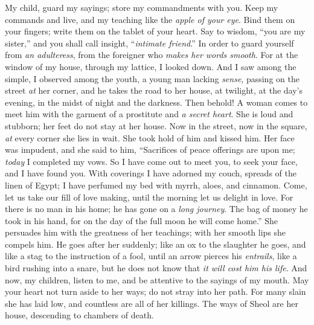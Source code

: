 \begin{biblechapter} %
 My child, guard my sayings; 
store my commandments with you.
\verse Keep my commands and live, 
and my teaching like the \textit{apple of your eye}.
\verse Bind them on your fingers; 
write them on the tablet of your heart.
\verse Say to wisdom, “you are my sister,” 
and you shall call insight, “\textit{intimate friend}.”
\verse In order to guard yourself from \textit{an adulteress}, 
from the foreigner who \textit{makes her words smooth}.
\verse For at the window of my house, 
through my lattice, I looked down.
\verse And I saw among the simple, 
I observed among the youth, 
a young man lacking \textit{sense},
\verse passing on the street \textit{at} her corner, 
and he takes the road to her house,
\verse at twilight, at the day’s evening, 
in the midst of night and the darkness.
\verse Then behold! A woman comes to meet him 
with the garment of a prostitute and \textit{a secret heart}.
\verse She is loud and stubborn; 
her feet do not stay at her house.
\verse Now in the street, now in the square, 
\textit{at} every corner she lies in wait.
\verse She took hold of  him and kissed him. 
Her face was impudent, and she said to him,
\verse “Sacrifices of peace offerings are upon me; 
\textit{today} I completed my vows.
\verse So I have come out to meet you, 
to seek your face, and I have found you.
\verse With coverings I have adorned my couch, 
spreads of the linen of Egypt;
\verse I have perfumed my bed with myrrh, 
aloes, and cinnamon.
\verse Come, let us take our fill of love making, 
until the morning let us delight in love.
\verse For there is no man in his home; 
he has gone on a \textit{long journey}.
\verse The bag of money he took in his hand, 
for on the day of the full moon he will come home.”
\verse She persuades him with the greatness of her teachings; 
with her smooth lips she compels him.
\verse He goes after her suddenly; 
like an ox to the slaughter he goes, 
and like a stag to the instruction of a fool,
\verse until an arrow pierces his \textit{entrails}, 
like a bird rushing into a snare, 
but he does not know that \textit{it will cost him his life}.
 And now, my children, listen to me, 
and be attentive to the sayings of my mouth.
\verse May your heart not turn aside to her ways; 
do not stray into her path.
\verse For many slain she has laid low, 
and countless are all of her killings.
\verse The ways of Sheol are her house, 
descending to chambers of death.
\end{biblechapter}

